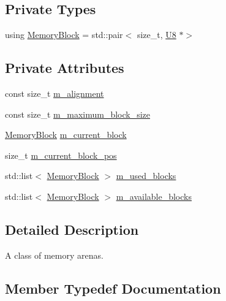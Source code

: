 \subsection*{Private Types}
\begin{DoxyCompactItemize}
\item 
using \hyperlink{classmage_1_1_memory_arena_a133e9d40bd216e3f1d98c6a2b36cf373}{Memory\+Block} = std\+::pair$<$ size\+\_\+t, \hyperlink{namespacemage_afc638980bc6154f15af5e2d93a0e0ea9}{U8} $\ast$$>$
\end{DoxyCompactItemize}
\subsection*{Private Attributes}
\begin{DoxyCompactItemize}
\item 
const size\+\_\+t \hyperlink{classmage_1_1_memory_arena_a424c3ff6f1d96545dd08f94c1c79c963}{m\+\_\+alignment}
\item 
const size\+\_\+t \hyperlink{classmage_1_1_memory_arena_aeef4c56cf50fd3cbbba2879fcd028b86}{m\+\_\+maximum\+\_\+block\+\_\+size}
\item 
\hyperlink{classmage_1_1_memory_arena_a133e9d40bd216e3f1d98c6a2b36cf373}{Memory\+Block} \hyperlink{classmage_1_1_memory_arena_a2680b25146c174ac7fd639f1bd0acc7c}{m\+\_\+current\+\_\+block}
\item 
size\+\_\+t \hyperlink{classmage_1_1_memory_arena_a880d07eb372ce1c8b907947fcbdfc59c}{m\+\_\+current\+\_\+block\+\_\+pos}
\item 
std\+::list$<$ \hyperlink{classmage_1_1_memory_arena_a133e9d40bd216e3f1d98c6a2b36cf373}{Memory\+Block} $>$ \hyperlink{classmage_1_1_memory_arena_a49a6d7fb9396f57210897abfb4e30903}{m\+\_\+used\+\_\+blocks}
\item 
std\+::list$<$ \hyperlink{classmage_1_1_memory_arena_a133e9d40bd216e3f1d98c6a2b36cf373}{Memory\+Block} $>$ \hyperlink{classmage_1_1_memory_arena_a02f251a5aafa61d239b4daed3458a654}{m\+\_\+available\+\_\+blocks}
\end{DoxyCompactItemize}


\subsection{Detailed Description}
A class of memory arenas. 

\subsection{Member Typedef Documentation}
\hypertarget{classmage_1_1_memory_arena_a133e9d40bd216e3f1d98c6a2b36cf373}{}\label{classmage_1_1_memory_arena_a133e9d40bd216e3f1d98c6a2b36cf373} 
